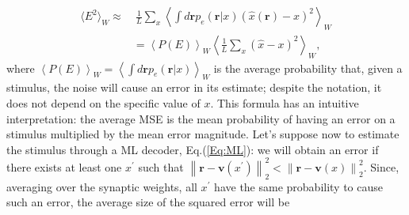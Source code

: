 \documentclass[a4paper]{article}%
\begin{document}
\begin{equation}
\begin{split}
\langle E^{2} \rangle_{W} \approx & \ \frac{1}{L}\sum_{x}\left \langle \int
d\mathbf{r}  p_{e}(\mathbf{r}|x) \left(\hat{x}(\mathbf{r})
-x \right)^{2}\right\rangle_{W}\\
& =\left\langle P(E)\right \rangle_{W} \left\langle\frac{1}{L}\sum_{x} (\hat
{x}-x)^{2}\right\rangle_{W},\label{Eq:PE}
\end{split}
\end{equation}
where $\left \langle P(E)\right \rangle_{W} = \left \langle\int d\mathbf{r}
p_{e}(\mathbf{r}|x)\right \rangle_{W}$ is the average probability that, given a
stimulus, the noise will cause an error in its estimate; despite the notation,
it does not depend on the specific value of $x$. This formula has an
intuitive interpretation: the average MSE is the mean probability of having an
error on a stimulus multiplied by the mean error magnitude. Let's suppose now to
estimate the stimulus through a ML decoder, Eq.(\ref{Eq:ML}): we will obtain
an error if there exists at least one $x^{\prime}$ such that $\left\|
\mathbf{r}-\mathbf{v}(x^{\prime}) \right\| _{2}^{2} < \left\|  \mathbf{r}
-\mathbf{v}(x)\right\| _{2}^{2}$. Since, averaging over the synaptic weights,
all $x^{\prime}$ have the same probability to cause such an error, the average
size of the squared error will be
\end{document}
